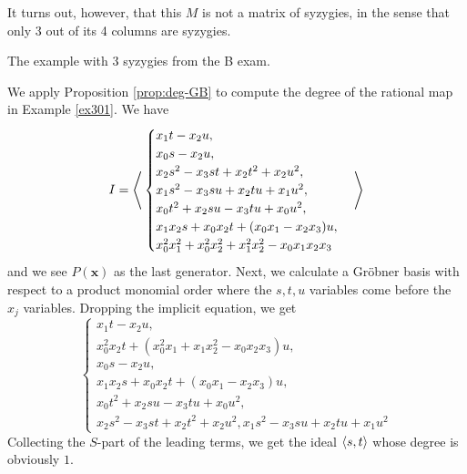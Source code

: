\documentclass[fleqn,reqno]{amsart}
\numberwithin{first}{chapter}
\begin{document}
\begin{example}[313]
\label{ex313}
It turns out, however, that this $M$ is not a matrix of syzygies,
in the sense that only 3 out of its 4 columns are syzygies.

The example with 3 syzygies from the B exam.
\end{example}

\begin{example}[$\mt{ex314}$]
\label{ex314}
We apply Proposition \ref{prop:deg-GB} to compute the degree of the rational map
in Example \ref{ex301}.
We have
\[
	I=\Bigg\langle
	\begin{cases}
		{x}_{1} t-{x}_{2} u,\\{x}_{0} s-{x}_{2} u,\\{x}_{2} s^{2}-{x}_{3} s t+{x}_{2}
	     t^{2}+{x}_{2} u^{2},\\{x}_{1} s^{2}-{x}_{3} s u+{x}_{2} t u+{x}_{1} u^{2},\\{x}_{0}
	     t^{2}+{x}_{2} s u-{x}_{3} t u+{x}_{0} u^{2},\\{x}_{1} {x}_{2} s+{x}_{0} {x}_{2}
	     t+({x}_{0} {x}_{1}-{x}_{2} {x}_{3}) u,\\{x}_{0}^{2} {x}_{1}^{2}+{x}_{0}^{2}
	     {x}_{2}^{2}+{x}_{1}^{2} {x}_{2}^{2}-{x}_{0} {x}_{1} {x}_{2} {x}_{3}
	\end{cases}\Bigg\rangle
\]
and we see $P(\mathbf x)$ as the last generator.
Next, we calculate a Gr\"obner basis with respect to a product monomial order where
the $s,t,u$ variables come before the $x_j$ variables.
Dropping the implicit equation, we get
\[
	\begin{cases}
		{x}_{1} t-{x}_{2} u,\\{x}_{0}^{2}
	      {x}_{2} t+({x}_{0}^{2} {x}_{1}+{x}_{1} {x}_{2}^{2}-{x}_{0} {x}_{2} {x}_{3})
	      u,\\{x}_{0} s-{x}_{2} u,\\{x}_{1} {x}_{2} s+{x}_{0} {x}_{2} t+({x}_{0}
	      {x}_{1}-{x}_{2} {x}_{3}) u,\\{x}_{0} t^{2}+{x}_{2} s u-{x}_{3} t u+{x}_{0}
	      u^{2},\\{x}_{2} s^{2}-{x}_{3} s t+{x}_{2} t^{2}+{x}_{2} u^{2},{x}_{1}
	      s^{2}-{x}_{3} s u+{x}_{2} t u+{x}_{1} u^{2}
	\end{cases}
\]
Collecting the $S$-part of the leading terms, we get the ideal $\langle s,t\rangle$ whose degree
is obviously $1$.


\end{example}
\end{document}
